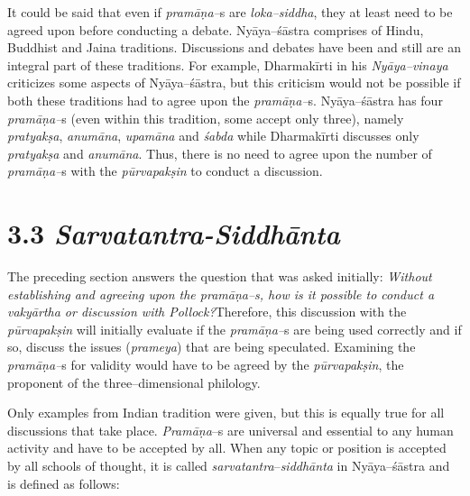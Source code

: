 It could be said that even if \textit{pramāṇa–}s are \textit{loka–siddha}, they at least need to be agreed upon before conducting a debate. Nyāya–śāstra comprises of Hindu, Buddhist and Jaina traditions. Discussions and debates have been and still are an integral part of these traditions. For example, Dharmakīrti in his \textit{Nyāya–vinaya} criticizes some aspects of Nyāya–śāstra, but this criticism would not be possible if both these traditions had to agree upon the \textit{pramāṇa–}s. Nyāya–śāstra has four \textit{pramāṇa–}s (even within this tradition, some accept only three), namely \textit{pratyakṣa}, \textit{anumāna}, \textit{upamāna} and \textit{śabda} while Dharmakīrti discusses only \textit{pratyakṣa} and \textit{anumāna}. Thus, there is no need to agree upon the number of \textit{pramāṇa–}s with the \textit{pūrvapakṣin} to conduct a discussion.

\vspace{-.3cm}

\section*{3.3 {\it {\bfseries Sarvatantra-Siddhānta}}}

\vspace{-.2cm}

The preceding section answers the question that was asked initially: \textit{Without establishing and agreeing upon the pramāṇa–s, how is it possible to conduct a vakyārtha or discussion with Pollock?}Therefore, this discussion with the \textit{pūrvapakṣin} will initially evaluate if the \textit{pramāṇa–}s are being used correctly and if so, discuss the issues (\textit{prameya}) that are being speculated. Examining the \textit{pramāṇa–}s for validity would have to be agreed by the \textit{pūrvapakṣin}, the proponent of the three–dimensional philology.

Only examples from Indian tradition were given, but this is equally true for all discussions that take place. \textit{Pramāṇa}–s are universal and essential to any human activity and have to be accepted by all. When any topic or position is accepted by all schools of thought, it is called \textit{sarvatantra}–\textit{siddhānta} in Nyāya–śāstra and is defined as follows:


